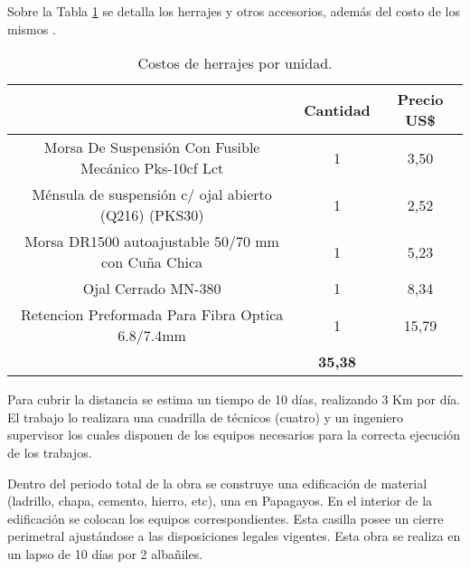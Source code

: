 Sobre la Tabla \ref{tab:costos-herr}  se detalla los herrajes y otros accesorios, además del costo de los mismos \cite{costosherr}.%




\begin{table}[H]
  \centering
    \begin{tabular}{|cc|c|}
    \hline
    \rowcolor[rgb]{ .773,  .851,  .945} \multicolumn{1}{|c|}{\textbf{Articulo}} & \textbf{Cantidad} & \textbf{Precio US\$} \bigstrut\\
    \hline
    \multicolumn{1}{|c|}{Morsa De Suspensión Con Fusible Mecánico Pks-10cf Lct} & 1     & 3,50 \bigstrut\\
    \hline
    \multicolumn{1}{|c|}{Ménsula de suspensión c/ ojal abierto (Q216) (PKS30) } & 1     & 2,52 \bigstrut\\
    \hline
    \multicolumn{1}{|c|}{Morsa DR1500 autoajustable 50/70 mm con Cuña Chica} & 1     & 5,23 \bigstrut\\
    \hline
    \multicolumn{1}{|c|}{Ojal Cerrado MN-380} & 1     & 8,34 \bigstrut\\
    \hline
    \multicolumn{1}{|c|}{Retencion Preformada Para Fibra Optica 6.8/7.4mm} & 1     & 15,79 \bigstrut\\
    \hline
    \rowcolor[rgb]{ .773,  .851,  .945} \multicolumn{2}{|c|}{\textbf{Total}} & \textbf{35,38} \bigstrut\\
    \hline
    \end{tabular}%
	\caption{Costos de herrajes por unidad.}
  \label{tab:costos-herr}%
\end{table}%






Para cubrir la distancia se estima un tiempo de 10 días, realizando 3 Km por día. El trabajo lo realizara una cuadrilla de técnicos (cuatro) y un ingeniero supervisor los cuales disponen de los equipos necesarios para la correcta ejecución de los trabajos.

Dentro del periodo total de la obra se construye una edificación de material (ladrillo, chapa, cemento, hierro, etc), una en Papagayos. En el interior de la edificación se colocan los equipos correspondientes. Esta casilla posee un cierre perimetral ajustándose a las disposiciones legales vigentes. Esta obra se realiza en un lapso de 10 días por 2 albañiles.


